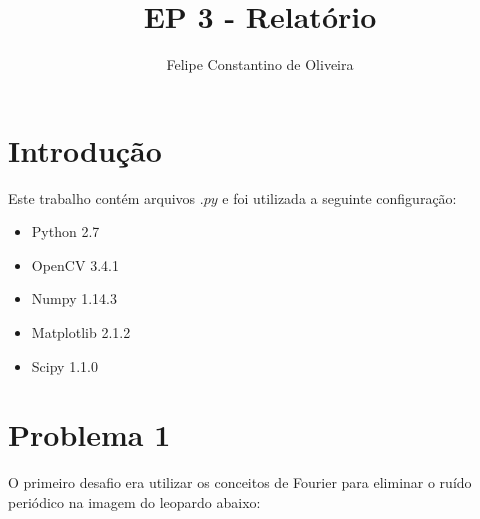\documentclass{article}
\title {\vspace{-3cm}EP 3 - Relatório}
\author{Felipe Constantino de Oliveira}
\affil{%
	MAC0417/5768 - Visão e Processamento de Imagens - IME-USP
}
\date{}
\begin{document}
	
	\maketitle

	\section{Introdução}
	
	Este trabalho contém arquivos $.py$ e foi utilizada a seguinte configuração:
	\begin{itemize}
		\item Python 2.7
		\item OpenCV 3.4.1
		\item Numpy 1.14.3
		\item Matplotlib 2.1.2
		\item Scipy 1.1.0
	\end{itemize}
	
	\section{Problema 1}

	O primeiro desafio era utilizar os conceitos de Fourier para eliminar o ruído periódico na imagem do leopardo abaixo:
	
	
\end{document}
